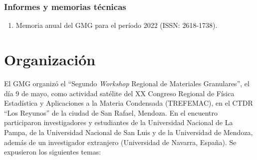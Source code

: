 \documentclass[a4paper,11pt,twoside,final,titlepage,onecolumn,openright]{report}
\begin{document}
\subsubsection{Informes y memorias técnicas}
\begin{enumerate}
 \item Memoria anual del GMG para el período 2022 (ISSN: 2618-1738).
\end{enumerate}
\vspace{0.25cm}
\section{Organización}
\vspace{0.5cm}

El GMG organizó el ``Segundo \textit{Workshop} Regional de Materiales Granulares'', el día 9 de mayo, como actividad satélite del XX Congreso Regional de Física Estadística y Aplicaciones a la Materia Condensada (TREFEMAC), en el CTDR ``Los Reyunos'' de la ciudad de San Rafael, Mendoza. En el encuentro participaron investigadores y estudiantes de la Universidad Nacional de La Pampa, de la Universidad Nacional de San Luis y de la Universidad de Mendoza, además de un investigador extranjero (Universidad de Navarra, España). Se expusieron los siguientes temas:
\end{document}
